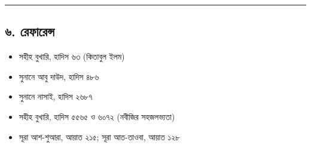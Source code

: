 \medskip\hrule\medskip

\subsection*{৬. রেফারেন্স}

\begin{itemize}
\item সহীহ বুখারি, হাদিস ৬৩ (কিতাবুল ইলম)
\item সুনানে আবু দাউদ, হাদিস ৪৮৬
\item সুনানে নাসাই, হাদিস ২৬৮৭
\item সহীহ বুখারি, হাদিস ৫৫৬৫ ও ৬০৭২ (নবীজির সহজলভ্যতা)
\item সূরা আশ-শুআরা, আয়াত ২১৫; সূরা আত-তাওবা, আয়াত ১২৮
\end{itemize}


